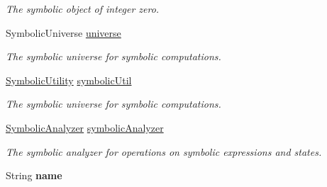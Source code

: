 \begin{DoxyCompactItemize}
\begin{DoxyCompactList}\small\item\em The symbolic object of integer zero. \end{DoxyCompactList}\item 
\hypertarget{classedu_1_1udel_1_1cis_1_1vsl_1_1civl_1_1library_1_1common_1_1LibraryComponent_a15e177f8c241bccac36c3ac9fd65a0b7}{}Symbolic\+Universe \hyperlink{classedu_1_1udel_1_1cis_1_1vsl_1_1civl_1_1library_1_1common_1_1LibraryComponent_a15e177f8c241bccac36c3ac9fd65a0b7}{universe}\label{classedu_1_1udel_1_1cis_1_1vsl_1_1civl_1_1library_1_1common_1_1LibraryComponent_a15e177f8c241bccac36c3ac9fd65a0b7}

\begin{DoxyCompactList}\small\item\em The symbolic universe for symbolic computations. \end{DoxyCompactList}\item 
\hypertarget{classedu_1_1udel_1_1cis_1_1vsl_1_1civl_1_1library_1_1common_1_1LibraryComponent_a18214426269e7c352f4926264837c8a6}{}\hyperlink{interfaceedu_1_1udel_1_1cis_1_1vsl_1_1civl_1_1dynamic_1_1IF_1_1SymbolicUtility}{Symbolic\+Utility} \hyperlink{classedu_1_1udel_1_1cis_1_1vsl_1_1civl_1_1library_1_1common_1_1LibraryComponent_a18214426269e7c352f4926264837c8a6}{symbolic\+Util}\label{classedu_1_1udel_1_1cis_1_1vsl_1_1civl_1_1library_1_1common_1_1LibraryComponent_a18214426269e7c352f4926264837c8a6}

\begin{DoxyCompactList}\small\item\em The symbolic universe for symbolic computations. \end{DoxyCompactList}\item 
\hypertarget{classedu_1_1udel_1_1cis_1_1vsl_1_1civl_1_1library_1_1common_1_1LibraryComponent_a7a1213c02b2d29a79f550c7090594967}{}\hyperlink{interfaceedu_1_1udel_1_1cis_1_1vsl_1_1civl_1_1semantics_1_1IF_1_1SymbolicAnalyzer}{Symbolic\+Analyzer} \hyperlink{classedu_1_1udel_1_1cis_1_1vsl_1_1civl_1_1library_1_1common_1_1LibraryComponent_a7a1213c02b2d29a79f550c7090594967}{symbolic\+Analyzer}\label{classedu_1_1udel_1_1cis_1_1vsl_1_1civl_1_1library_1_1common_1_1LibraryComponent_a7a1213c02b2d29a79f550c7090594967}

\begin{DoxyCompactList}\small\item\em The symbolic analyzer for operations on symbolic expressions and states. \end{DoxyCompactList}\item 
\hypertarget{classedu_1_1udel_1_1cis_1_1vsl_1_1civl_1_1library_1_1common_1_1LibraryComponent_aaec07e3e9d1818b94595bfbf9425bd80}{}String {\bfseries name}\label{classedu_1_1udel_1_1cis_1_1vsl_1_1civl_1_1library_1_1common_1_1LibraryComponent_aaec07e3e9d1818b94595bfbf9425bd80}


\end{DoxyCompactItemize}
